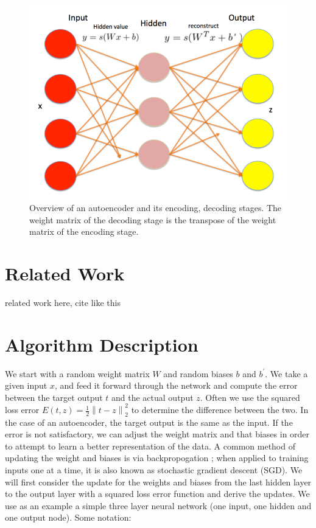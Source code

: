 \documentclass[conference]{IEEEtran}
\newcommand{\norm}[1]{\left\lVert #1 \right\rVert}
\begin{document}
\begin{figure}[h]
\centering
\includegraphics[width=0.9\linewidth]{autoencoder.png}
\caption{Overview of an autoencoder and its encoding, decoding stages. The weight matrix of the decoding stage is the transpose of the weight matrix of the encoding stage.}
\label{fig:autoencoder}
\end{figure}

\section{Related Work}
related work here, cite like this \cite{vincent2010stacked}

\section{Algorithm Description}
We start with a random weight matrix $W$ and random biases $b$ and $b^{'}$. We take a given input $x$, and feed it forward through the network and 
compute the error between the target output $t$ and the actual output $z$. Often we use the squared loss error $E(t,z) = \frac{1}{2}\norm{t-z}_2^2$ to determine the difference between the two. In the case of an autoencoder, the target output is the same as the input. If the error is not satisfactory, we can adjust the weight matrix and that biases in order to attempt to learn a better representation of the data. A common method of updating the weight and biases is via backpropogation \cite{hecht1989theory}; when applied to training inputs one at a time, it is also known as stochastic gradient descent (SGD). We will first consider the update for the weights and biases from the last hidden layer to the output layer with a squared loss error function and derive the updates. We use as an example a simple three layer neural network (one input, one hidden and one output node). Some notation:
\end{document}

